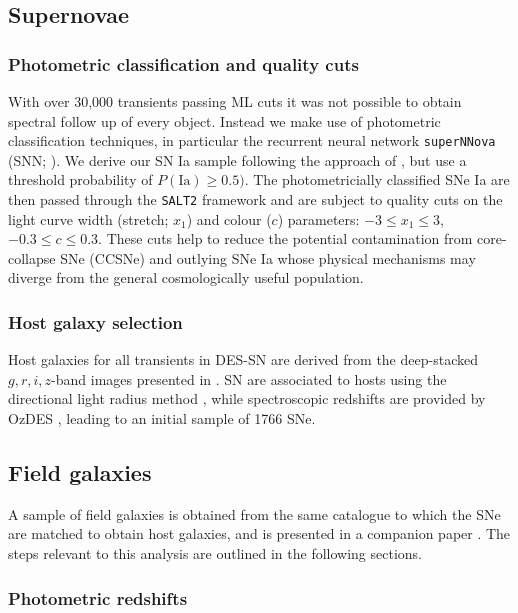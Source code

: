 \documentclass[fleqn,usenatbib]{mnras}
\begin{document}
\subsection{Supernovae \label{subsec:host_sample}}
\subsubsection{Photometric classification and quality cuts \label{subsubsec:sn_classify}}
With over 30,000 transients passing ML cuts it was not possible to obtain spectral follow up of every object. Instead we make use of photometric classification techniques, in particular the recurrent neural network \texttt{superNNova} (SNN; \citealt{Moller2019}). We derive our SN Ia sample following the approach of \citet{Scolnic2020}, but use a threshold probability of $P(\mathrm{Ia})\geq0.5)$. The photometricially classified SNe Ia are then passed through the \texttt{SALT2} framework \citep{Betoule2014} and are subject to quality cuts on the light curve width (stretch; $x_1$) and colour ($c$) parameters: $-3 \leq x_1 \leq 3$, $-0.3 \leq c \leq 0.3$. These cuts help to reduce the potential contamination from core-collapse SNe (CCSNe) and outlying SNe Ia whose physical mechanisms may diverge from the general cosmologically useful population.

\subsubsection{Host galaxy selection \label{subsubsec:sn_hosts}}
Host galaxies for all transients in DES-SN are derived from the deep-stacked $g, r, i, z$-band images presented in \citet{Wiseman2020}. SN are associated to hosts using the directional light radius method \citep[e.g.][]{Sullivan2006,Gupta2016}, while spectroscopic redshifts are provided by OzDES \citep{Yuan2015,Childress2017,Lidman2020}, leading to an initial sample of 1766 SNe.

\subsection{Field galaxies\label{subsec:field_sample}}
A sample of field galaxies is obtained from the same catalogue to which the SNe are matched to obtain host galaxies, and is presented in a companion paper \citet{Wiseman2021}. The steps relevant to this analysis are outlined in the following sections.

\subsubsection{Photometric redshifts \label{subsubsec:photozs}}
\end{document}
